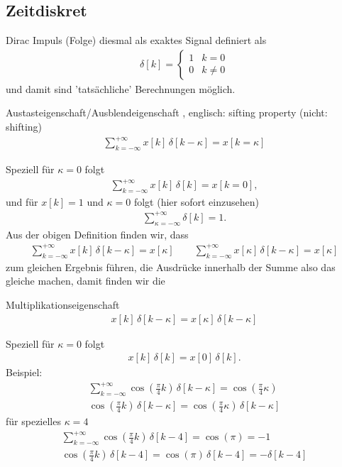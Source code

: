 \subsection{Zeitdiskret}
Dirac Impuls (Folge) diesmal als exaktes Signal definiert als
\begin{align}
\delta[k] =
\begin{cases}
1 & k=0\\
0 & k \neq 0
\end{cases}
\end{align}
und damit sind 'tatsächliche' Berechnungen möglich.
\begin{mdframed}
Austasteigenschaft/Ausblendeigenschaft , englisch: sifting property (nicht: shifting)
\begin{align}
\sum\limits_{k=-\infty}^{+\infty} x[k] \, \delta[k-\kappa] = x[k=\kappa]
\label{eq:AppA_SifitingDT}
\end{align}
\end{mdframed}
Speziell für $\kappa=0$ folgt
\begin{align}
\sum\limits_{k=-\infty}^{+\infty} x[k] \, \delta[k] = x[k=0],
\end{align}
und für $x[k]=1$ und $\kappa=0$ folgt (hier sofort einzusehen)
\begin{align}
\sum\limits_{\kappa=-\infty}^{+\infty} \delta[k] = 1.
\end{align}
Aus der obigen Definition finden wir, dass
\begin{align}
\sum\limits_{k=-\infty}^{+\infty} x[k] \, \delta[k-\kappa] = x[\kappa]\qquad
\sum\limits_{k=-\infty}^{+\infty} x[\kappa] \, \delta[k-\kappa] = x[\kappa]
\end{align}
zum gleichen Ergebnis führen, die Ausdrücke innerhalb der Summe also das gleiche
machen, damit finden wir die
\begin{mdframed}
Multiplikationseigenschaft
\begin{align}
x[k] \, \delta[k-\kappa] = x[\kappa] \, \delta[k-\kappa]
\end{align}
\end{mdframed}
Speziell für $\kappa=0$ folgt
\begin{align}
x[k] \, \delta[k] = x[0] \, \delta[k].
\end{align}
%
Beispiel:
\begin{align}
\sum\limits_{k=-\infty}^{+\infty} \cos(\frac{\pi}{4} k) \, \delta[k-\kappa] =\cos(\frac{\pi}{4} \kappa)\\
\cos(\frac{\pi}{4} k) \, \delta[k-\kappa] = \cos(\frac{\pi}{4} \kappa) \, \delta[k-\kappa]
\end{align}
für spezielles $\kappa=4$
\begin{align}
\sum\limits_{k=-\infty}^{+\infty} \cos(\frac{\pi}{4} k) \, \delta[k-4] =\cos(\pi) = -1\\
\cos(\frac{\pi}{4} k) \, \delta[k-4] = \cos(\pi) \, \delta[k-4] = -\delta[k-4]
\end{align}

